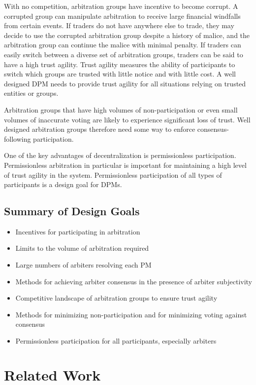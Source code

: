 \documentclass[onecolumn]{article}
\begin{document}
With no competition, arbitration groups have incentive to become corrupt.
A corrupted group can manipulate arbitration to receive large financial windfalls from certain events.
If traders do not have anywhere else to trade, they may decide to use the corrupted arbitration group despite a history of malice, and the arbitration group can continue the malice with minimal penalty.
If traders can easily switch between a diverse set of arbitration groups, traders can be said to have a high trust agility.
Trust agility measures the ability of participants to switch which groups are trusted with little notice and with little cost.
A well designed DPM needs to provide trust agility for all situations relying on trusted entities or groups.

Arbitration groups that have high volumes of non-participation or even small volumes of inaccurate voting are likely to experience significant loss of trust.
Well designed arbitration groups therefore need some way to enforce consensus-following participation.

One of the key advantages of decentralization is permissionless participation.
Permissionless arbitration in particular is important for maintaining a high level of trust agility in the system.
Permissionless participation of all types of participants is a design goal for DPMs.

\subsection{Summary of Design Goals}
\begin{itemize}
	\item Incentives for participating in arbitration
	\item Limits to the volume of arbitration required
	\item Large numbers of arbiters resolving each PM
	\item Methods for achieving arbiter consensus in the presence of arbiter subjectivity
	\item Competitive landscape of arbitration groups to ensure trust agility
	\item Methods for minimizing non-participation and for minimizing voting against consensus
	\item Permissionless participation for all participants, especially arbiters
\end{itemize}

\section{Related Work}
\end{document}
